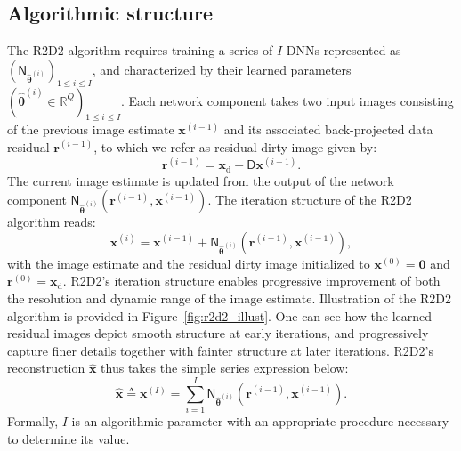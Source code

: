 \documentclass[preprint2,twocolumn]{aastex631}
\newcommand{\xb}{\ensuremath{\boldsymbol{x}}}
\newcommand{\rb}{\ensuremath{\boldsymbol{r}}}
\newcommand{\Nb}{\ensuremath{\boldsymbol{\mathsf{N}}}}
\newcommand{\Db}{\ensuremath{\boldsymbol{\mathsf{D}}}}
\newcommand{\thetab}{\ensuremath{\boldsymbol{\theta}}}
\newcommand{\eR}{\mathbb{R}}
\begin{document}
\subsection{Algorithmic structure} \label{subsec:Algorithmic-structure}
The R2D2 algorithm requires training a series of $I$ DNNs represented as $(\Nb_{\widehat{\thetab}^{(i)}})_{1 \leq i \leq I}$, and characterized by their learned parameters $({\widehat{\thetab}^{(i)}} \in \eR^{Q})_{1 \leq i \leq I}$. Each network component takes two input images consisting of the previous image estimate $\xb^{(i-1)}$ and its associated back-projected data residual $\rb^{(i-1)}$, to which we refer as residual dirty image given by:
\begin{equation}
 \rb^{(i-1)}=\xb_{\textrm{d}}-\Db\xb^{(i-1)}.
 \label{eq:residual_update}
\end{equation}
The current image estimate is updated from the output of the network component ${\Nb_{\widehat{\thetab}^{(i)}}}(\rb^{(i-1)}, \xb^{(i-1)})$. The iteration structure of the R2D2 algorithm reads: 
\begin{equation}
\xb^{(i)}=\xb^{(i-1)} + {\Nb_{\widehat{\thetab}^{(i)}}}(\rb^{(i-1)}, \xb^{(i-1)}),
\label{eq:image_update}
\end{equation}
with the image estimate and the residual dirty image initialized to $\xb^{(0)} = \bm{0}$ and $\rb^{(0)} = \xb_{\textrm{d}}$. 
R2D2's iteration structure enables progressive improvement of both the resolution and dynamic range of the image estimate. Illustration of the R2D2 algorithm is provided in Figure~\ref{fig:r2d2_illust}. One can see how the learned residual images depict smooth structure at early iterations, and progressively capture finer details together with fainter structure at later iterations. R2D2's reconstruction $\widehat{\xb}$ thus takes the simple series expression below:
\begin{equation}
\widehat{\xb} \triangleq \xb^{(I)}= \sum_{i=1}^{I} {\Nb_{\widehat{\thetab}^{(i)}}(\rb^{(i-1)},\xb^{(i-1)})}.
\label{eq:sum_interp}
\end{equation}
\noindent
Formally, $I$ is an algorithmic parameter with an appropriate procedure necessary to determine its value.
\end{document}
